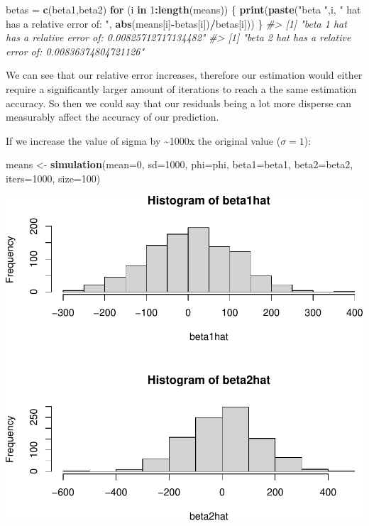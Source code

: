 \documentclass[]{article}
\newenvironment{Shaded}{\begin{snugshade}}{\end{snugshade}}
\newcommand{\CommentTok}[1]{\textcolor[rgb]{0.56,0.35,0.01}{\textit{#1}}}
\newcommand{\ControlFlowTok}[1]{\textcolor[rgb]{0.13,0.29,0.53}{\textbf{#1}}}
\newcommand{\DataTypeTok}[1]{\textcolor[rgb]{0.13,0.29,0.53}{#1}}
\newcommand{\DecValTok}[1]{\textcolor[rgb]{0.00,0.00,0.81}{#1}}
\newcommand{\KeywordTok}[1]{\textcolor[rgb]{0.13,0.29,0.53}{\textbf{#1}}}
\newcommand{\NormalTok}[1]{#1}
\newcommand{\OperatorTok}[1]{\textcolor[rgb]{0.81,0.36,0.00}{\textbf{#1}}}
\newcommand{\StringTok}[1]{\textcolor[rgb]{0.31,0.60,0.02}{#1}}
\begin{document}
\begin{Shaded}
\begin{Highlighting}[]
\NormalTok{betas =}\StringTok{ }\KeywordTok{c}\NormalTok{(beta1,beta2)}
\ControlFlowTok{for}\NormalTok{ (i }\ControlFlowTok{in} \DecValTok{1}\OperatorTok{:}\KeywordTok{length}\NormalTok{(means)) \{}
    \KeywordTok{print}\NormalTok{(}\KeywordTok{paste}\NormalTok{(}\StringTok{"beta "}\NormalTok{,i, }\StringTok{" hat has a relative error of: "}\NormalTok{, }\KeywordTok{abs}\NormalTok{(means[i]}\OperatorTok{-}\NormalTok{betas[i])}\OperatorTok{/}\NormalTok{betas[i]))}
\NormalTok{\}}
\CommentTok{#> [1] "beta  1  hat has a relative error of:  0.00825712717134482"}
\CommentTok{#> [1] "beta  2  hat has a relative error of:  0.00836374804721126"}
\end{Highlighting}
\end{Shaded}

We can see that our relative error increases, therefore our estimation
would either require a significantly larger amount of iterations to
reach a the same estimation accuracy. So then we could say that our
residuals being a lot more disperse can measurably affect the accuracy
of our prediction.

\newpage

If we increase the value of sigma by \textasciitilde{}1000x the original
value (\(\sigma = 1\)):

\begin{Shaded}
\begin{Highlighting}[]
\NormalTok{means <-}\StringTok{ }\KeywordTok{simulation}\NormalTok{(}\DataTypeTok{mean=}\DecValTok{0}\NormalTok{, }\DataTypeTok{sd=}\DecValTok{1000}\NormalTok{, }\DataTypeTok{phi=}\NormalTok{phi, }\DataTypeTok{beta1=}\NormalTok{beta1, }\DataTypeTok{beta2=}\NormalTok{beta2, }\DataTypeTok{iters=}\DecValTok{1000}\NormalTok{, }\DataTypeTok{size=}\DecValTok{100}\NormalTok{)}
\end{Highlighting}
\end{Shaded}

\includegraphics{./figures/unnamed-chunk-10-1.pdf}
\end{document}
